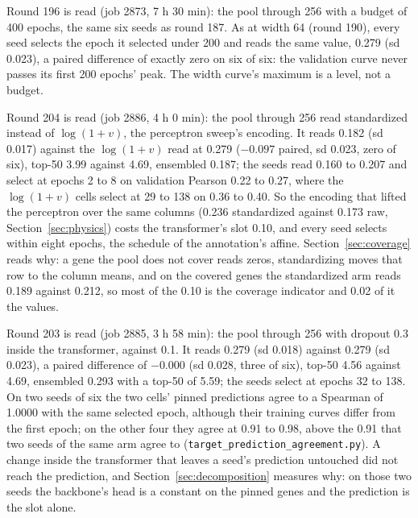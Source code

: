Round 196 is read (job 2873, 7 h 30 min): the pool through 256 with a budget of 400
epochs, the same six seeds as round 187. As at width 64 (round 190), every seed selects
the epoch it selected under 200 and reads the same value, 0.279 (sd 0.023), a paired
difference of exactly zero on six of six: the validation curve never passes its first
200 epochs' peak. The width curve's maximum is a level, not a budget.

Round 204 is read (job 2886, 4 h 0 min): the pool through 256 read standardized
instead of $\log(1+v)$, the perceptron sweep's encoding. It reads 0.182 (sd 0.017)
against the $\log(1+v)$ read at 0.279 ($-0.097$ paired, sd 0.023, zero of six),
top-50 3.99 against 4.69, ensembled 0.187; the seeds read 0.160 to 0.207 and select
at epochs 2 to 8 on validation Pearson 0.22 to 0.27, where the $\log(1+v)$ cells
select at 29 to 138 on 0.36 to 0.40. So the encoding that lifted the perceptron over
the same columns (0.236 standardized against 0.173 raw, Section~\ref{sec:physics})
costs the transformer's slot 0.10, and every seed selects within eight epochs, the
schedule of the annotation's affine. Section~\ref{sec:coverage} reads why: a gene the
pool does not cover reads zeros, standardizing moves that row to the column means, and
on the covered genes the standardized arm reads 0.189 against 0.212, so most of the
0.10 is the coverage indicator and 0.02 of it the values.

Round 203 is read (job 2885, 3 h 58 min): the pool through 256 with dropout 0.3 inside
the transformer, against 0.1. It reads 0.279 (sd 0.018) against 0.279 (sd 0.023), a
paired difference of $-0.000$ (sd 0.028, three of six), top-50 4.56 against 4.69,
ensembled 0.293 with a top-50 of 5.59; the seeds select at epochs 32 to 138. On two
seeds of six the two cells' pinned predictions agree to a Spearman of 1.0000 with the
same selected epoch, although their training curves differ from the first epoch; on the
other four they agree at 0.91 to 0.98, above the 0.91 that two seeds of the same arm
agree to (\texttt{target\_prediction\_agreement.py}). A change inside the
transformer that leaves a seed's prediction untouched did not reach the prediction,
and Section~\ref{sec:decomposition} measures why: on those two seeds the backbone's
head is a constant on the pinned genes and the prediction is the slot alone.

